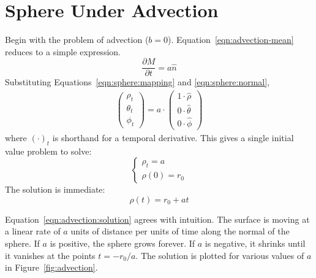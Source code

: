 \documentclass[journal]{IEEEtran}
\begin{document}
\section{Sphere Under Advection}
\label{sec:advection}
Begin with the problem of advection ($b = 0$).
Equation~\ref{eqn:advection-mean} reduces to a simple expression.
\begin{equation}
  \frac{\partial M}{\partial t} = a \hat{n}
\end{equation}
Substituting Equations~\ref{eqn:sphere:mapping} and \ref{eqn:sphere:normal},
\begin{align}
  \begin{pmatrix}
    \rho_t \\
    \theta_t \\
    \phi_t
  \end{pmatrix} = a \cdot
  \begin{pmatrix}
    1 \cdot \hat{\rho} \\
    0 \cdot \hat{\theta} \\
    0 \cdot \hat{\phi}
  \end{pmatrix}
\end{align}
where $\left(\cdot\right)_t$ is shorthand for a temporal derivative.
This gives a single initial value problem to solve:
\begin{equation}
  \left\{
    \begin{array}{ll}
      \rho_t = a\\
      \rho(0) = r_0
    \end{array}
  \right.
\end{equation}
The solution is immediate:
\begin{equation}
  \label{eqn:advection:solution}
  \rho(t) = r_0 + at
\end{equation}

Equation~\ref{eqn:advection:solution} agrees with intuition.
The surface is moving at a linear rate of $a$ units of distance per units of time along the normal of the sphere.
If $a$ is positive, the sphere grows forever.
If $a$ is negative, it shrinks until it vanishes at the points $t = -r_0/a$.
The solution is plotted for various values of $a$ in Figure~\ref{fig:advection}.
\end{document}
